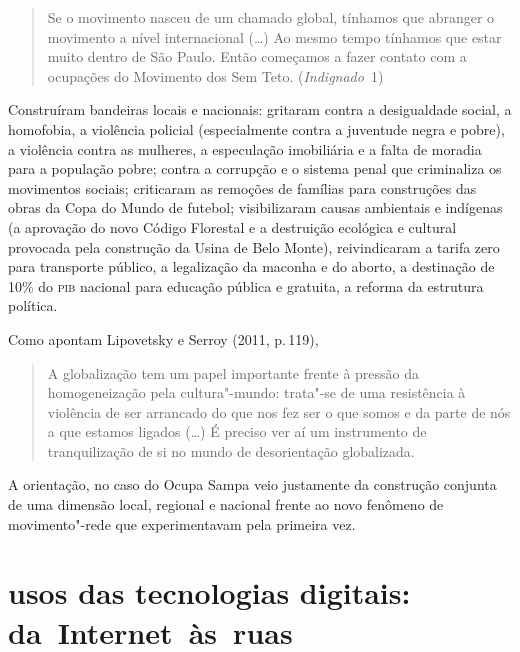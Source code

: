 \begin{quote}
Se o movimento nasceu de um chamado global, tínhamos que abranger o
movimento a nível internacional (\ldots{}) Ao mesmo tempo tínhamos que estar
muito dentro de São Paulo. Então começamos a fazer contato com a
ocupações do Movimento dos Sem Teto. (\textit{Indignado}~1)
\end{quote}

Construíram bandeiras locais e nacionais: gritaram contra a desigualdade
social, a homofobia, a violência policial (especialmente contra a
juventude negra e pobre), a violência contra as mulheres, a especulação
imobiliária e a falta de moradia para a população pobre; contra a
corrupção e o sistema penal que criminaliza os movimentos sociais;
criticaram as remoções de famílias para construções das obras da Copa do
Mundo de futebol; visibilizaram causas ambientais e indígenas (a
aprovação do novo Código Florestal e a destruição ecológica e cultural
provocada pela construção da Usina de Belo Monte), reivindicaram a
tarifa zero para transporte público, a legalização da maconha e do
aborto, a destinação de 10\% do \textsc{pib} nacional para educação pública e
gratuita, a reforma da estrutura política.

Como apontam Lipovetsky e Serroy (2011, p.\,119),

\begin{quote}
A globalização tem um papel importante frente à pressão da
homogeneização pela cultura"-mundo: trata"-se de uma resistência à
violência de ser arrancado do que nos fez ser o que somos e da parte de
nós a que estamos ligados (\ldots{}) É preciso ver aí um instrumento de
tranquilização de si no mundo de desorientação globalizada.
\end{quote}

A orientação, no caso do Ocupa Sampa veio justamente da construção
conjunta de uma dimensão local, regional e nacional frente ao novo
fenômeno de movimento"-rede que experimentavam pela primeira vez.

\section{usos das tecnologias digitais: da~Internet~às~ruas}

